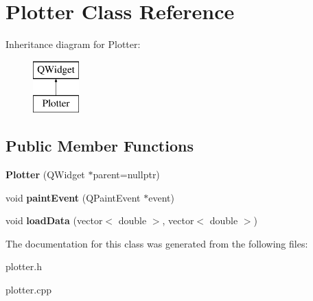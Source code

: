 \hypertarget{class_plotter}{}\section{Plotter Class Reference}
\label{class_plotter}
Inheritance diagram for Plotter\+:\begin{figure}[H]
\begin{center}
\leavevmode
\includegraphics[height=2.000000cm]{class_plotter}
\end{center}
\end{figure}
\subsection*{Public Member Functions}
\begin{DoxyCompactItemize}
\item 
\mbox{\label{class_plotter_a1807627530de30ae58dff3c42a823497}} 
{\bfseries Plotter} (Q\+Widget $\ast$parent=nullptr)
\item 
\mbox{\label{class_plotter_a06477bf987646f000a8982db1352a11d}} 
void {\bfseries paint\+Event} (Q\+Paint\+Event $\ast$event)
\item 
\mbox{\label{class_plotter_a7a76d1994c235e353d34da7144eb29bc}} 
void {\bfseries load\+Data} (vector$<$ double $>$, vector$<$ double $>$)
\end{DoxyCompactItemize}


The documentation for this class was generated from the following files\+:\begin{DoxyCompactItemize}
\item 
plotter.\+h\item 
plotter.\+cpp\end{DoxyCompactItemize}
